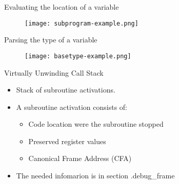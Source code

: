 
\begin{frame}{Evaluating the location of a variable}
	\begin{figure}
		\texttt{[image: subprogram-example.png]}
	\end{figure}
\end{frame}


\begin{frame}{Parsing the type of a variable}
	\begin{figure}
		\texttt{[image: basetype-example.png]}
	\end{figure}
\end{frame}


\begin{frame}{Virtually Unwinding Call Stack}
    \begin{itemize}
        \item Stack of subroutine activations.
        \item A subroutine activation consists of:
    	\begin{itemize}
    	    \item Code location were the subroutine stopped
    	    \item Preserved register values
	    \item Canonical Frame Address (CFA)
    	\end{itemize}
        \item The needed infomarion is in section .debug\_frame
    \end{itemize}
\end{frame}


